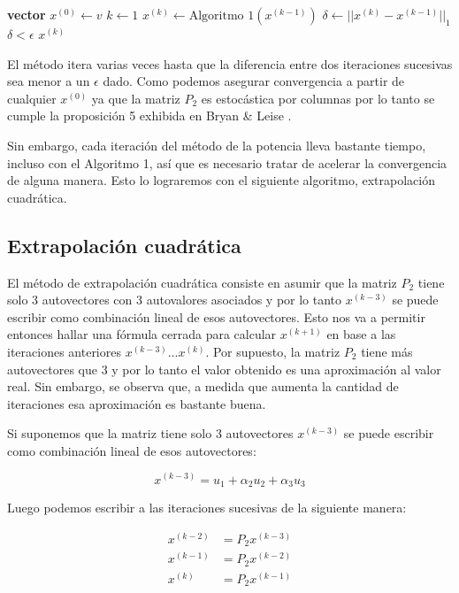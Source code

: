 \begin{algorithmic}
		\State \textbf{vector} $x^{(0)} \gets v$
		\State $k \gets 1$ \Repeat
		\State $x^{(k)} \gets \text{Algoritmo 1}(x^{(k-1)})$
		\State $\delta \gets ||x^{(k)} - x^{(k-1)}||_{1}$ \Until $\delta < \epsilon$
		\State \Return $x^{(k)}$
	\EndFunction
\end{algorithmic}

\vspace{0.5cm}

El m\'etodo itera varias veces hasta que la diferencia entre dos iteraciones sucesivas sea menor a un $\epsilon$ dado. Como podemos asegurar convergencia a partir de cualquier $x^{(0)}$ ya que la matriz $P_{2}$ es estoc\'astica por columnas por lo tanto se cumple la proposici\'on 5  exhibida en Bryan \& Leise \cite[Secci\'on 4]{Bryan2006}.

Sin embargo, cada iteraci\'on del m\'etodo de la potencia lleva bastante tiempo, incluso con el Algoritmo 1, as\'i que es necesario tratar de acelerar la convergencia de alguna manera. Esto lo lograremos con el siguiente algoritmo, extrapolaci\'on cuadr\'atica.


\subsection{Extrapolaci\'on cuadr\'atica}

El m\'etodo de extrapolaci\'on cuadr\'atica \cite[Secci\'on 4]{Kamvar2003}consiste en asumir que la matriz $P_{2}$ tiene solo 3 autovectores con 3 autovalores asociados y por lo tanto $x^{(k-3)}$ se puede escribir como combinaci\'on lineal de esos autovectores. Esto nos va a permitir entonces hallar una f\'ormula cerrada para calcular $x^{(k+1)}$ en base a las iteraciones anteriores $x^{(k-3)} \dots x^{(k)}$. Por supuesto, la matriz $P_{2}$ tiene m\'as autovectores que 3 y por lo tanto el valor obtenido es una aproximaci\'on al valor real. Sin embargo, se observa que, a medida que aumenta la cantidad de iteraciones esa aproximaci\'on es bastante buena.

Si suponemos que la matriz tiene solo 3 autovectores $x^{(k-3)}$ se puede escribir como combinaci\'on lineal de esos autovectores:

\[
	x^{(k-3)} = u_{1} + \alpha_{2}u_{2} + \alpha_{3}u_{3}
\]

Luego podemos escribir a las iteraciones sucesivas de la siguiente manera:

\begin{align*}
	x^{(k-2)} &= P_{2}x^{(k-3)}\\
	x^{(k-1)} &= P_{2}x^{(k-2)}\\
	x^{(k)} &= P_{2}x^{(k-1)}
\end{align*}

